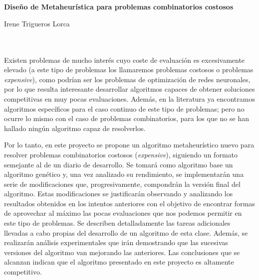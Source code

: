 \chapter*{}






\cleardoublepage
\thispagestyle{empty}

\begin{center}
{\large\bfseries Diseño de Metaheurística para problemas combinatorios costosos}\\
\end{center}
\begin{center}
Irene Trigueros Lorca\\
\end{center}

\\

\vspace{0.7cm}
\\

Existen problemas de mucho interés cuyo coste de evaluación es excesivamente elevado (a este tipo de problemas los llamaremos problemas costosos o problemas \textit{expensive}), como podrían ser los problemas de optimización de redes neuronales, por lo que resulta interesante desarrollar algoritmos capaces de obtener soluciones competitivas en muy pocas evaluaciones. 
Además, en la literatura ya encontramos algoritmos específicos para el caso continuo de este tipo de problemas; pero no ocurre lo mismo con el caso de problemas combinatorios, para los que no se han hallado ningún algoritmo capaz de resolverlos.

Por lo tanto, en este proyecto se propone un algoritmo metaheurístico nuevo para resolver problemas combinatorios costosos (\textit{expensive}), siguiendo un formato semejante al de un diario de desarrollo. 
Se tomará como algoritmo base un algoritmo genético y, una vez analizado su rendimiento, se implementarán una serie de modificaciones que, progresivamente, compondrán la versión final del algoritmo. 
Estas modificaciones se justificarán observando y analizando los resultados obtenidos en los intentos anteriores con el objetivo de encontrar formas de aprovechar al máximo las pocas evaluaciones que nos podemos permitir en este tipo de problemas. 
Se describen detalladamente las tareas adicionales llevadas a cabo propias del desarrollo de un algoritmo de esta clase. 
Además, se realizarán análisis experimentales que irán demostrando que las sucesivas versiones del algoritmo van mejorando las anteriores.
Las conclusiones que se alcanzan indican que el algoritmo presentado en este proyecto es altamente competitivo. 



